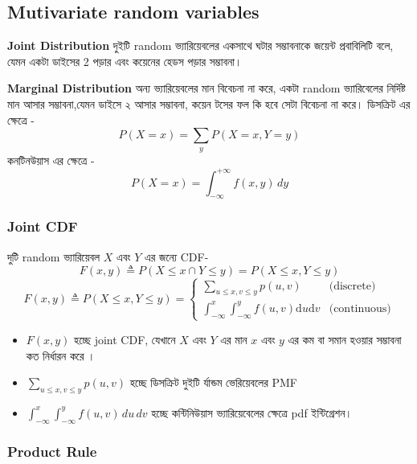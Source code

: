 \documentclass[graybox, envcountchap, twocolumn]{styles/svmult}
\begin{document}
\subsection{Mutivariate random variables}
\textbf{Joint Distribution}
{\bengalifont দুইটি random ভ্যারিয়েবলের একসাথে ঘটার সম্ভাবনাকে জয়েন্ট প্রবাবিলিটি বলে, যেমন একটা ডাইসের 2 পড়ার এবং কয়েনের হেডস পড়ার সম্ভাবনা। }

\textbf{Marginal Distribution}
{\bengalifont অন্য ভ্যারিয়েবলের মান বিবেচনা না করে, একটা random ভ্যারিবেলের নির্দিষ্ট মান আসার সম্ভাবনা,যেমন ডাইসে ২ আসার সম্ভাবনা, কয়েন টসের ফল কি হবে সেটা বিবেচনা না করে।
ডিসক্রিট এর ক্ষেত্রে - }
\begin{equation}
    P(X = x) = \sum_y P(X = x, Y = y)
\end{equation} 
{\bengalifont কনটিনউয়াস এর ক্ষেত্রে }- 
\begin{equation}
    P(X = x) = \int_{-\infty}^{+\infty} f(x, y) \, dy
\end{equation}

\subsubsection{Joint CDF}
{\bengalifont দুটি random ভ্যারিয়েবল $X$ এবং $Y$ এর জন্যে } CDF- 
\[
F(x,y) \triangleq P(X \leq x \cap Y \leq y)=P(X \leq x , Y \leq y)
\]
\begin{equation}
F(x,y) \triangleq P(X \leq x, Y \leq y) = \begin{cases}
\sum_{u \leq x, v \leq y} p(u,v) & \text{(discrete)} \\
\int_{-\infty}^{x} \int_{-\infty}^{y} f(u,v)\mathrm{d}u \mathrm{d}v & \text{(continuous)}
\end{cases}
\end{equation}

\begin{itemize}
    \item $F(x, y)$ { \bengalifont হচ্ছে joint CDF, {\bengalifont যেখানে  $X$ এবং $Y$ এর মান $x$ এবং $y$ এর কম বা সমান হওয়ার সম্ভাবনা কত নির্ধারন করে ।}}
    \item $\sum_{u \leq x, v \leq y} p(u, v)$ {\bengalifont হচ্ছে ডিসক্রিট দুইটি র্যান্ডম ভেরিয়েবলের PMF}
    \item $\int_{-\infty}^{x} \int_{-\infty}^{y} f(u, v) \, du \, dv$ {\bengalifont হচ্ছে কন্টিনিউয়াস ভ্যারিয়েবেলের ক্ষেত্রে pdf ইন্টিগ্রেশন।}
\end{itemize}

\subsubsection{Product Rule}
\end{document}
